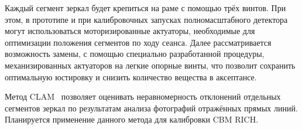 

Каждый сегмент зеркал будет крепиться на раме с помощью трёх винтов. При этом, в прототипе и при калибровочных запусках полномасштабного детектора могут использоваться моторизированные актуаторы, необходимые для оптимизации положения сегментов по ходу сеанса. Далее рассматривается возможность замены, с помощью специально разработанной процедуры, механизированных актуаторов на легкие опорные винты, что позволит сохранить оптимальную юстировку и снизить количество вещества в аксептансе.


Метод CLAM~\cite{CLAM} позволяет оценивать неравномерность отклонений отдельных сегментов зеркал по результатам анализа фотографий отражённых прямых линий. Планируется применение данного метода для калибровки CBM RICH.



